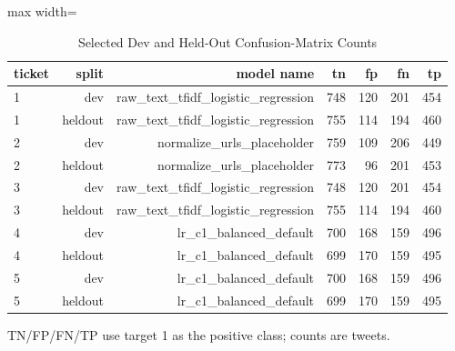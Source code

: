 \begin{table}[t]
\centering
\caption{Selected Dev and Held-Out Confusion-Matrix Counts}
\label{tab:confusion_summary}
\begin{adjustbox}{max width=\textwidth}
\scriptsize
\begin{tabular}{lrrrrrr}
\hline
ticket & split & model name & tn & fp & fn & tp \\
\hline
1 & dev & raw\_text\_tfidf\_logistic\_regression & 748 & 120 & 201 & 454 \\
1 & heldout & raw\_text\_tfidf\_logistic\_regression & 755 & 114 & 194 & 460 \\
2 & dev & normalize\_urls\_placeholder & 759 & 109 & 206 & 449 \\
2 & heldout & normalize\_urls\_placeholder & 773 & 96 & 201 & 453 \\
3 & dev & raw\_text\_tfidf\_logistic\_regression & 748 & 120 & 201 & 454 \\
3 & heldout & raw\_text\_tfidf\_logistic\_regression & 755 & 114 & 194 & 460 \\
4 & dev & lr\_c1\_balanced\_default & 700 & 168 & 159 & 496 \\
4 & heldout & lr\_c1\_balanced\_default & 699 & 170 & 159 & 495 \\
5 & dev & lr\_c1\_balanced\_default & 700 & 168 & 159 & 496 \\
5 & heldout & lr\_c1\_balanced\_default & 699 & 170 & 159 & 495 \\
\hline
\end{tabular}
\end{adjustbox}
\par\footnotesize{TN/FP/FN/TP use target 1 as the positive class; counts are tweets.}
\end{table}
